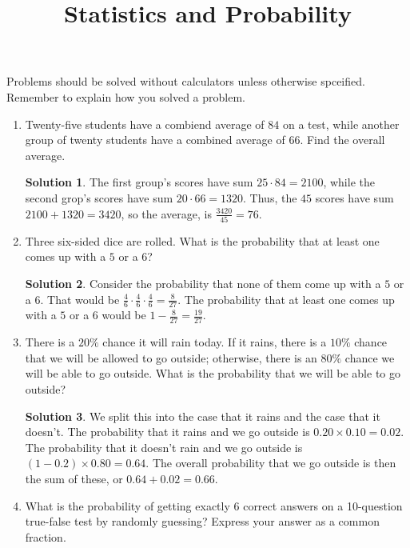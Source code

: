 \documentclass{article}
\title{Statistics and Probability}
\date{}
\author{}
\theoremstyle{definition}
\newtheorem*{solution}{Solution}
\begin{document}
    \maketitle
    \noindent Problems should be solved without calculators unless otherwise spceified.
    Remember to explain how you solved a problem.
    \begin{enumerate}
        \item Twenty-five students have a combiend average of $84$ on a test,
        while another group of twenty students have a combined average of $66$.
        Find the overall average.
        \begin{solution}
            The first group's scores have sum $25 \cdot 84 = 2100$, while the second
            grop's scores have sum $20 \cdot 66 = 1320$. Thus, the $45$ scores have sum
            $2100 + 1320 = 3420$, so the average, is $\frac{3420}{45} = 76$.
        \end{solution}
        \item Three six-sided dice are rolled. What is the probability that at least one
        comes up with a $5$ or a $6$?
        \begin{solution}
            Consider the probability that none of them come up with a $5$ or a $6$. That
            would be $\frac{4}{6} \cdot \frac{4}{6} \cdot \frac{4}{6} = \frac{8}{27}$. The
            probability that at least one comes up with a $5$ or a $6$ would be
            $1 - \frac{8}{27} = \frac{19}{27}$.
        \end{solution}
        \item There is a $20\%$ chance it will rain today. If it rains, there is a $10\%$
        chance that we will be allowed to go outside; otherwise, there is an $80\%$ chance
        we will be able to go outside. What is the probability that we will be able to
        go outside?
        \begin{solution}
            We split this into the case that it rains and the case that it doesn't. The
            probability that it rains and we go outside is $0.20 \times 0.10 = 0.02$.
            The probability that it doesn't rain and we go outside is $(1 - 0.2) \times 0.80 = 0.64$.
            The overall probability that we go outside is then the sum of these,
            or $0.64 + 0.02 = 0.66$.
        \end{solution}
        \item What is the probability of getting exactly $6$ correct answers on a
        10-question true-false test by randomly guessing? Express your answer as a common fraction.

\end{enumerate}
\end{document}

